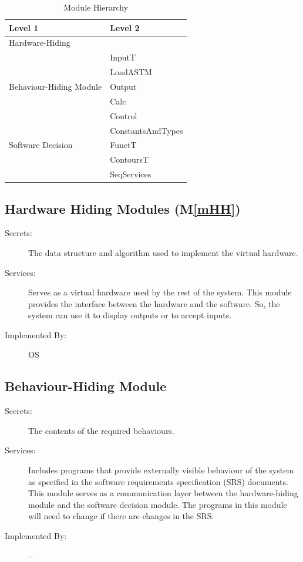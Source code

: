 \documentclass[12pt]{article}
\newcommand{\mref}[1]{M\ref{#1}}
\begin{document}
\begin{table}[h!]
\centering
\begin{tabular}{p{} p{}}
\toprule
\textbf{Level 1} & \textbf{Level 2}\\
\midrule

{Hardware-Hiding} & ~ \\
\midrule

\multirow{5}{0.3\textwidth}{Behaviour-Hiding Module} 
& InputT\\
& LoadASTM\\
& Output\\
& Calc\\
& Control\\
& ConstantsAndTypes\\

\midrule

\multirow{1}{0.3\textwidth}{Software Decision}
& FunctT\\
& ContoursT\\
& SeqServices\\

\bottomrule

\end{tabular}
\caption{Module Hierarchy}
\label{TblMH}
\end{table}

\subsection{Hardware Hiding Modules (\mref{mHH})}

\begin{description}
\item[Secrets:]The data structure and algorithm used to implement the virtual
  hardware.
\item[Services:]Serves as a virtual hardware used by the rest of the
  system. This module provides the interface between the hardware and the
  software. So, the system can use it to display outputs or to accept inputs.
\item[Implemented By:] OS
\end{description}

\subsection{Behaviour-Hiding Module}

\begin{description}
\item[Secrets:]The contents of the required behaviours.
\item[Services:]Includes programs that provide externally visible behaviour of
  the system as specified in the software requirements specification (SRS)
  documents. This module serves as a communication layer between the
  hardware-hiding module and the software decision module. The programs in this
  module will need to change if there are changes in the SRS.
\item[Implemented By:] --
\end{description}
\end{document}
